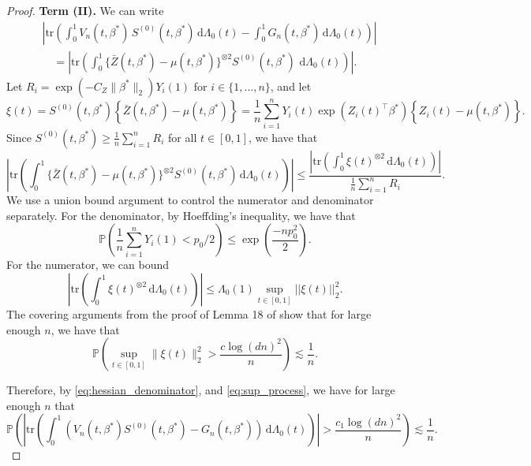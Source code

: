 \documentclass[11pt]{article}
\newcommand{\dint}{\,\mathrm{d}}
\begin{document}
\begin{proof}
\noindent \textbf{Term (II).} We can write 
\begin{align*}
& \left| \mathrm{tr}\left( \int_0^{1} V_n(t, \beta^*)\, S^{(0)}(t, \beta^*) \dint\Lambda_0(t) - \int_0^{1} G_n(t, \beta^*) \dint\Lambda_0(t) \right)\right| \\
&\quad= \left| \mathrm{tr} \left( \int_0^{1} \{\bar{Z}(t, \beta^*) - \mu(t, \beta^*)\}^{\otimes 2} S^{(0)}(t, \beta^*)\, \dint \Lambda_0(t) \right) \right|.
\end{align*}
Let $R_i = \exp(-C_Z \|\beta^*\|_2) Y_i(1)$ for $i \in \{1, \dots, n\}$, and let 
\begin{equation*}
    \xi(t) = S^{(0)}(t, \beta^*) \left\{\bar{Z}(t, \beta^*) - \mu(t, \beta^*)\right\} = \frac{1}{n}\sum_{i=1}^n Y_i(t) \exp(Z_i(t)^\top\beta^*)\left\{Z_i(t) - \mu(t, \beta^*)\right\}.
\end{equation*}
Since $S^{(0)}(t, \beta^*) \geq \frac{1}{n}\sum_{i=1}^n R_i$ for all $t \in [0, 1]$, we have that 
\begin{equation*}
    \left|\mathrm{tr} \left(\int_0^{1} \{\bar{Z}(t, \beta^*) - \mu(t, \beta^*)\}^{\otimes 2} S^{(0)}(t, \beta^*) \dint \Lambda_0(t) \right) \right| \leq \frac{\left|\mathrm{tr} \left(\int_0^{1}\xi(t)^{\otimes 2} \dint\Lambda_0(t) \right) \right|}{\frac{1}{n}\sum_{i=1}^n R_i}.
\end{equation*}
We use a union bound argument to control the numerator and denominator separately. For the denominator, by Hoeffding's inequality, we have that 
\begin{equation}
\mathbb{P}\left(\frac{1}{n} \sum_{i=1}^n Y_i(1) < p_0/2 \right) \leq \exp \left( \frac{-np_0^2}{2}\right).
\label{eq:hessian_denominator}
\end{equation}
For the numerator, we can bound 
\begin{equation*}
    \left| \mathrm{tr} \left(\int_0^{1} \xi(t)^{\otimes 2} \dint \Lambda_0(t) \right) \right|  \leq \Lambda_0(1) \sup_{t \in [0, 1]} ||\xi(t)||^2_2.
\end{equation*}
The covering arguments from the proof of Lemma 18 of \cite{FDPCox} show that for large enough $n$, we have that 
\begin{equation}
    \mathbb{P}\left(\sup_{t \in [0, 1]} \|\xi(t)\|_2^2 > \frac{c \log(dn)^2}{n} \right) \lesssim \frac{1}{n}.
    \label{eq:sup_process}
\end{equation}

Therefore, by \eqref{eq:hessian_denominator}, and \eqref{eq:sup_process}, we have for large enough $n$ that 
\begin{equation*}
   \mathbb{P} \left(\left| \mathrm{tr} \left(\int_0^{1}  \left(V_n(t, \beta^*) S^{(0)}(t, \beta^*)  - G_n(t, \beta^*) \right) \dint\Lambda_0(t) \right)\right|  > \frac{c_1 \log(dn)^2}{n} \right) \lesssim \frac{1}{n}. 
   \label{eq:hessian_2}
\end{equation*}


\end{proof}
\end{document}
